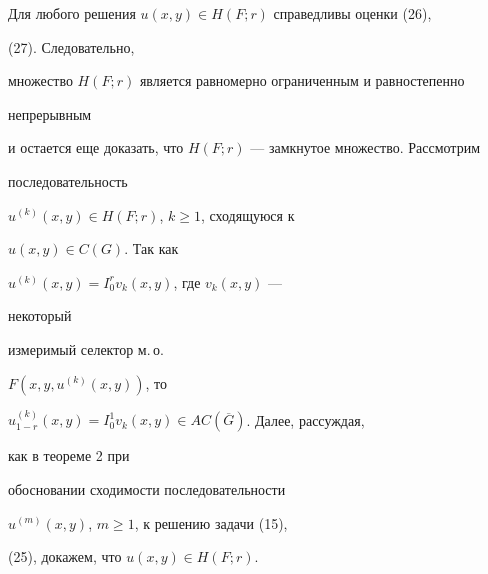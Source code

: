 \begin{pf} Для любого решения $u(x,y)\in H(F;r)$ справедливы оценки (26), 


(27). Следовательно, 


множество $H(F;r)$ является равномерно ограниченным и равностепенно 


непрерывным 


и остается еще доказать, что $H(F;r)$ --- замкнутое множество. Рассмотрим 


последовательность 


$u^{(k)}(x,y)\in H(F;r)$, $k\ge 1$, сходящуюся к 


$u(x,y)\in C(G)$. Так как 


$u^{(k)}(x,y)=I_0^rv_k(x,y)$, где $v_k(x,y)$ --- 


некоторый 


измеримый селектор м.\,о. 


$F(x,y,u^{(k)}(x,y))$, то 


$u^{(k)}_{1-r}(x,y)=I_0^1v_k(x,y)\in AC(\overline G)$. Далее, рассуждая, 


как в теореме 2 при 


обосновании сходимости последовательности 


$u^{(m)}(x,y)$, $m\ge 1$, к решению задачи (15), 


(25), докажем, что $u(x,y)\in H(F;r)$. 


\end{pf}


 


